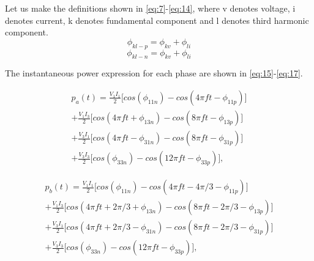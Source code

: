 \documentclass[conference,a4paper,twocolumn]{IEEEtran}
\begin{document}
Let us make the definitions shown in \ref{eq:7}-\ref{eq:14}, where v denotes voltage, i denotes current, k denotes fundamental component and l denotes third harmonic component.
\begin{equation} \label{eq:7}
\phi_{kl-p} = \phi_{kv}+\phi_{li}
\end{equation}
\begin{equation} \label{eq:8}
\phi_{kl-n} = \phi_{kv}+\phi_{li}
\end{equation}

The instantaneous power expression for each phase are shown in \ref{eq:15}-\ref{eq:17}.

\begin{equation}
\label{eq:15}
\begin{multlined}
p_a(t) = 
\frac{V_1I_1}{2} \bigg \lbrack cos(\phi_{11n})-cos(4\pi ft-\phi_{11p}) \bigg \rbrack
\\
+
\frac{V_1I_3}{2} \bigg \lbrack cos(4\pi ft+\phi_{13n})-cos(8\pi ft-\phi_{13p}) \bigg \rbrack
\\
+
\frac{V_3I_1}{2} \bigg \lbrack cos(4\pi ft-\phi_{31n})-cos(8\pi ft-\phi_{31p}) \bigg \rbrack
\\
+
\frac{V_3I_3}{2} \bigg \lbrack cos(\phi_{33n})-cos(12\pi ft-\phi_{33p}) \bigg \rbrack,
\end{multlined}
\end{equation}

\begin{equation}
\label{eq:16}
\begin{multlined}
p_b(t) = 
\frac{V_1I_1}{2} \bigg \lbrack cos(\phi_{11n})-cos(4\pi ft-4\pi/3-\phi_{11p}) \bigg \rbrack
\\
+
\frac{V_1I_3}{2} \bigg \lbrack cos(4\pi ft+ 2\pi/3+\phi_{13n})-cos(8\pi ft-2\pi/3-\phi_{13p}) \bigg \rbrack
\\
+
\frac{V_3I_1}{2} \bigg \lbrack cos(4\pi ft+2\pi/3-\phi_{31n})-cos(8\pi ft-2\pi/3-\phi_{31p}) \bigg \rbrack
\\
+
\frac{V_3I_3}{2} \bigg \lbrack cos(\phi_{33n})-cos(12\pi ft-\phi_{33p}) \bigg \rbrack,
\end{multlined}
\end{equation}
\end{document}
